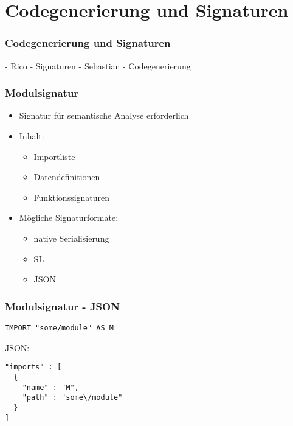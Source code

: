 \section{Codegenerierung und Signaturen}

\begin{frame}
\frametitle{Codegenerierung und Signaturen}
    - Rico - Signaturen
    - Sebastian - Codegenerierung
\end{frame}


\begin{frame}
\frametitle{Modulsignatur}

\begin{itemize}
\item Signatur für semantische Analyse erforderlich
\item Inhalt:
	\begin{itemize}
	\item Importliste
	\item Datendefinitionen
	\item Funktionssignaturen
	\end{itemize}
\item Mögliche Signaturformate:
	\begin{itemize}
	\item native Serialisierung
	\item SL
	\item JSON
	\end{itemize}
\end{itemize}

\end{frame}


\begin{frame}[containsverbatim=true]
\frametitle{Modulsignatur - JSON}

\begin{verbatim}
IMPORT "some/module" AS M
\end{verbatim}

JSON:

\begin{lstlisting}
"imports" : [
  {
    "name" : "M",
    "path" : "some\/module"
  }
]
\end{lstlisting}


\end{frame}
